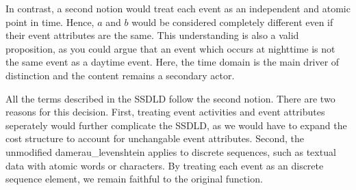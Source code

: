 \documentclass[./../../paper.tex]{subfiles}
\begin{document}
In contrast, a second notion would treat each event as an independent and atomic point in time. Hence, $a$ and $b$ would be considered completely different even if their event attributes are the same. This understanding is also a valid proposition, as you could argue that an event which occurs at nighttime is not the same event as a daytime event. Here, the time domain is the main driver of distinction and the content remains a secondary actor. 

All the terms described in the \gls{SSDLD} follow the second notion. There are two reasons for this decision. First, treating event activities and event attributes seperately would further complicate the \gls{SSDLD}, as we would have to expand the cost structure to account for unchangable event attributes. Second, the unmodified \gls{damerau_levenshtein} applies to discrete sequences, such as textual data with atomic words or characters. By treating each event as an discrete sequence element, we remain faithful to the original function. 
\end{document}
